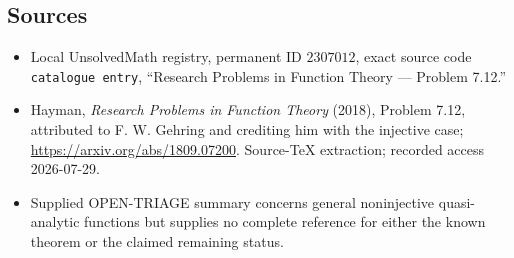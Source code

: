 \documentclass[11pt]{article}
\begin{document}
\subsection{Sources}
\begin{itemize}
\item Local UnsolvedMath registry, permanent ID \(2307012\), exact source code \texttt{catalogue entry}, ``Research Problems in Function Theory --- Problem 7.12.''
\item Hayman, \emph{Research Problems in Function Theory} (2018), Problem 7.12, attributed to F. W. Gehring and crediting him with the injective case; \url{https://arxiv.org/abs/1809.07200}. Source-TeX extraction; recorded access 2026-07-29.
\item Supplied OPEN-TRIAGE summary concerns general noninjective quasi-analytic functions but supplies no complete reference for either the known theorem or the claimed remaining status.
\end{itemize}
\end{document}
